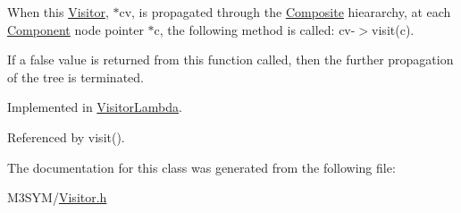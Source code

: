 When this \hyperlink{classVisitor}{Visitor}, $\ast$cv, is propagated through the \hyperlink{classComposite}{Composite} hieararchy, at each \hyperlink{classComponent}{Component} node pointer $\ast$c, the following method is called\+: cv-\/$>$visit(c). 

If a false value is returned from this function called, then the further propagation of the tree is terminated. 

Implemented in \hyperlink{classVisitorLambda_af934df1d8669dd315d824d9ee706f250}{Visitor\+Lambda}.



Referenced by visit().



The documentation for this class was generated from the following file\+:\begin{DoxyCompactItemize}
\item 
M3\+S\+Y\+M/\hyperlink{Visitor_8h}{Visitor.\+h}\end{DoxyCompactItemize}
